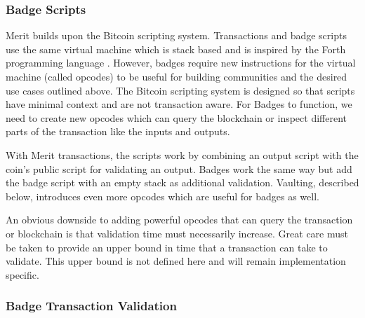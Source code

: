 \documentclass{article}
\begin{document}
\subsubsection{Badge Scripts}

Merit builds upon the Bitcoin scripting system.  Transactions and badge scripts use
the same virtual machine which is stack based and is inspired by the Forth programming
language \cite{scripts}.  However, badges require new instructions for the virtual
machine (called opcodes) to be useful for building communities and the desired
use cases outlined above.  The Bitcoin scripting system is designed so that scripts
have minimal context and are not transaction aware.  For Badges to function, we
need to create new opcodes which can query the blockchain or inspect different
parts of the transaction like the inputs and outputs.

\begin{center}
\end{center}

With Merit transactions, the scripts work by combining an output script with the
coin's public script for validating an output.  Badges work the same way but add
the badge script with an empty stack as additional validation.  Vaulting, described
below, introduces even more opcodes which are useful for badges as well.

An obvious downside to adding powerful opcodes that can query the transaction or
blockchain is that validation time must necessarily increase.  Great care must
be taken to provide an upper bound in time that a transaction can take to validate.
This upper bound is not defined here and will remain implementation specific. 

\subsubsection{Badge Transaction Validation}
\end{document}
